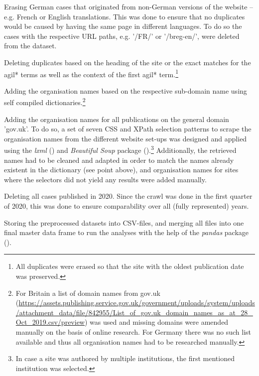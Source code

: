 \begin{compactitem}
\begin{compactitem}
    \end{compactitem}
\item Erasing German cases that originated from non-German versions of the website – e.g. French or English translations. This was done to ensure that no duplicates would be caused by having the same page in different languages. To do so the cases with the respective URL paths, e.g. '/FR/' or '/breg-en/', were deleted from the dataset.
\item Deleting duplicates based on the heading of the site or the exact matches for the agil* terms as well as the context of the first agil* term.\footnote{All duplicates were erased so that the site with the oldest publication date was preserved.}
\item Adding the organisation names based on the respective sub-domain name using self compiled dictionaries.\footnote{For Britain a list of domain names from gov.uk (\url{https://assets.publishing.service.gov.uk/government/uploads/system/uploads/attachment_data/file/842955/List_of_gov.uk_domain_names_as_at_28_Oct_2019.csv/preview}) was used and missing domains were amended manually on the basis of online research. For Germany there was no such list available and thus all organisation names had to be researched manually.} 
\item Adding the organisation names for all publications on the general domain 'gov.uk'. To do so, a set of seven CSS and XPath selection patterns to scrape the organisation names from the different website set-ups was designed and applied using the \textit{lxml} (\cite{Faassen2006}) and \textit{Beautiful Soup} package (\cite{Richardson2007}).\footnote{In case a site was authored by multiple institutions, the first mentioned institution was selected.} Additionally, the retrieved names had to be cleaned and adapted in order to match the names already existent in the dictionary (see point above), and organisation names for sites where the selectors did not yield any results were added manually. 
\item Deleting all cases published in 2020. Since the crawl was done in the first quarter of 2020, this was done to ensure comparability over all (fully represented) years.
\item Storing the preprocessed datasets into CSV-files, and merging all files into one final master data frame to run the analyses with the help of the \textit{pandas} package (\cite{McKinney2010}). 
\end{compactitem}

